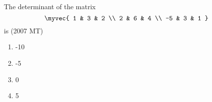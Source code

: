 \item The determinant of the matrix
$$
\myvec{
1 & 3 & 2 \\
2 & 6 & 4 \\
-5 & 3 & 1
}
$$
is \hfill (2007 MT)
\begin{multicols}{4}
\begin{enumerate}    
    \item -10
    \item -5
    \item 0
    \item 5
\end{enumerate}
\end{multicols}


